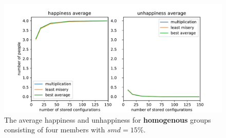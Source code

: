 \begin{figure}
    \centering
    \includegraphics[width=1\textwidth]{./figures/60_evaluation/homogenous_happy_unhappy_total_group_amount-1000_smd-15.pdf}
    \caption{The average happiness and unhappiness for \textbf{homogenous} groups consisting of four members with $smd=15\%$.}
    \label{fig:Evaluation:HomogenousGroupTotal}
\end{figure}
